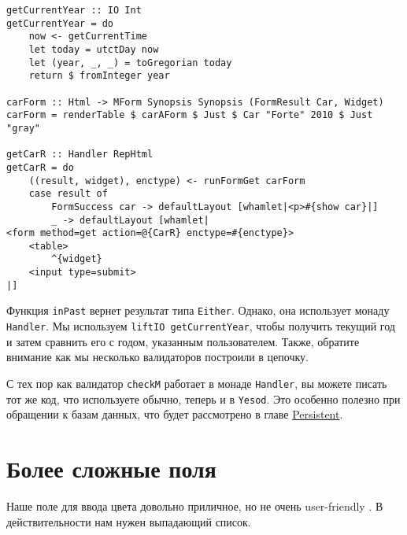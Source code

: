 \begin{lstlisting}
getCurrentYear :: IO Int
getCurrentYear = do
    now <- getCurrentTime
    let today = utctDay now
    let (year, _, _) = toGregorian today
    return $ fromInteger year

carForm :: Html -> MForm Synopsis Synopsis (FormResult Car, Widget)
carForm = renderTable $ carAForm $ Just $ Car "Forte" 2010 $ Just "gray"

getCarR :: Handler RepHtml
getCarR = do
    ((result, widget), enctype) <- runFormGet carForm
    case result of
        FormSuccess car -> defaultLayout [whamlet|<p>#{show car}|]
        _ -> defaultLayout [whamlet|
<form method=get action=@{CarR} enctype=#{enctype}>
    <table>
        ^{widget}
    <input type=submit>
|]
\end{lstlisting}

Функция \lstinline'inPast' вернет результат типа \lstinline'Either'. Однако, она
использует монаду \lstinline'Handler'. Мы используем \lstinline'liftIO getCurrentYear',
чтобы получить текущий год и затем сравнить его с годом, указанным пользователем. Также,
обратите внимание как мы несколько валидаторов построили в цепочку.

\begin{remark}
С тех пор как валидатор \lstinline'checkM' работает в монаде \lstinline'Handler', вы
можете писать тот же код, что используете обычно, теперь и в \lstinline'Yesod'. Это 
особенно полезно при обращении к базам данных, что будет рассмотрено в главе
\hyperref[ch:persistent]{Persistent}.
\end{remark}

\section{Более сложные поля}
Наше поле для ввода цвета довольно приличное, но не очень user-friendly
. В
действительности нам нужен выпадающий список.

